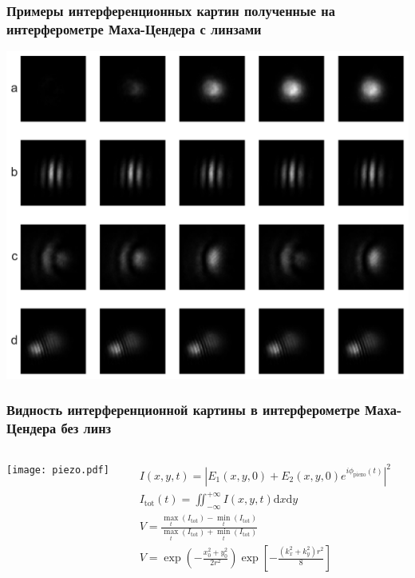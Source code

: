 \begin{frame}
    \frametitle{Примеры интерференционных картин полученные на интерферометре Маха-Цендера с линзами}
    \centering
    \includegraphics[width=0.8\linewidth]{images/Env_patterns.pdf}
\end{frame}

\begin{frame}
\frametitle{Видность интерференционной картины в интерферометре
Маха-Цендера без линз}

\begin{columns}
\centering
\texttt{[image: piezo.pdf]}

\begin{align*}
& I(x,y,t)=|E_1(x,y,0)+E_2(x,y,0)e^{i\phi_{\mathrm{piezo}}(t)}|^2 \\
& I_{\mathrm{tot}}(t) = \iint_{-\infty}^{+\infty} I(x, y, t) {\mathrm{d}}x{\mathrm{d}}y \\
& V = \frac{            
        \max_{t}(I_{\mathrm{tot}}) - \min_t(I_{\mathrm{tot}})}
        {\max_{t}(I_{\mathrm{tot}}) + \min_t(I_{\mathrm{tot}})} \\
& V = \exp\left(- \frac{x_0^2 + y_0^2}{2 r^2}\right)  \exp\left[- \frac{(k_x^2 + k_y^2) r^2}{8}\right] \\
\end{align*}

\end{columns}
\end{frame}

